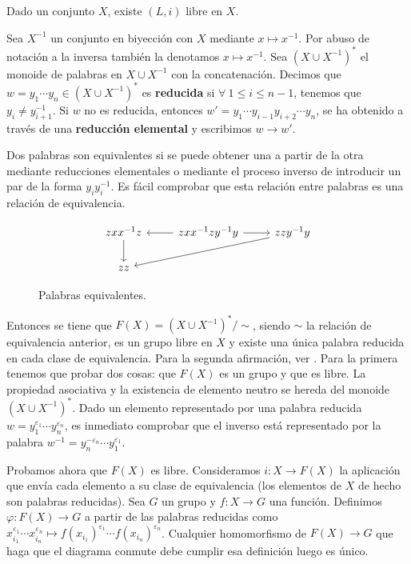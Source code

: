 \documentclass[bibtex, anon]{TEMat-article}
\begin{document}
\begin{teorema}\cite[\S II.5]{Aluffi}
	Dado un conjunto $X$, existe $(L,i)$ libre en $X$. 
\end{teorema}
\begin{demostracion}
	Sea $X^{-1}$ un conjunto en biyección con $X$ mediante $x\mapsto x^{-1}$. Por abuso de notación a la inversa también la denotamos $x\mapsto x^{-1}$. Sea $(X\cup X^{-1})^*$ el monoide de palabras en $X\cup X^{-1}$ con la concatenación. Decimos que $w=y_1\cdots y_n\in (X\cup X^{-1})^*$ es \textbf{reducida} si $\forall\ 1\leq i\leq n-1$, tenemos que $y_i\neq y_{i+1}^{-1}$. Si $w$ no es reducida, entonces $w'=y_1\cdots y_{i-1}y_{i+2}\cdots y_n$, se ha obtenido a través de una \textbf{reducción elemental} y escribimos $w\to w'$. 
	
	Dos palabras son equivalentes si se puede obtener una a partir de la otra mediante reducciones elementales o mediante el proceso inverso de introducir un par de la forma $y_iy_i^{-1}$. Es fácil comprobar que esta relación entre palabras es una relación de equivalencia.
	\begin{figure}[h!]
	\[
	\begin{tikzcd}
	zxx^{-1}z\arrow[d] & zxx^{-1}zy^{-1}y\arrow[l]\arrow[r] &zzy^{-1}y\arrow[lld]\\
	zz 
	\end{tikzcd}
	\]
	\caption{Palabras equivalentes.}
		\end{figure}
	
	Entonces se tiene que $F(X)=(X\cup X^{-1})^*/\sim$, siendo $\sim$ la relación de equivalencia anterior, es un grupo libre en $X$ y existe una única palabra reducida en cada clase de equivalencia. Para la segunda afirmación, ver \cite[\S 1]{reduced}. Para la primera tenemos que probar dos cosas: que $F(X)$ es un grupo y que es libre. La propiedad asociativa y la existencia de elemento neutro se hereda del monoide $(X\cup X^{-1})^*$. Dado un elemento representado por una palabra reducida $w=y_1^{\varepsilon_1}\cdots y_n^{\varepsilon_n}$, es inmediato comprobar que el inverso está representado por la palabra $w^{-1}=y_n^{-\varepsilon_n}\cdots y_1^{\varepsilon_1}$. 
	
	Probamos ahora que $F(X)$ es libre. Consideramos $i:X\to F(X)$ la aplicación que envía cada elemento a su clase de equivalencia (los elementos de $X$ de hecho son palabras reducidas). Sea $G$ un grupo y $f:X\to G$ una función. Definimos $\varphi:F(X)\to G$ a partir de las palabras reducidas como $x_{i_1}^{\varepsilon_1}\cdots x_{i_n}^{\varepsilon_n}\mapsto f(x_{i_1})^{\varepsilon_1}\cdots f(x_{i_n})^{\varepsilon_n}$. Cualquier homomorfismo de $F(X)\to G$ que haga que el diagrama conmute debe cumplir esa definición luego es único. %
	
\end{demostracion}
\end{document}
